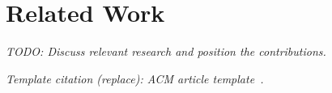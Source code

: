 \section{Related Work}
\label{sec:related-work}
\textit{TODO: Discuss relevant research and position the contributions.}

\textit{Template citation (replace): ACM article template~\cite{acmart}.}

